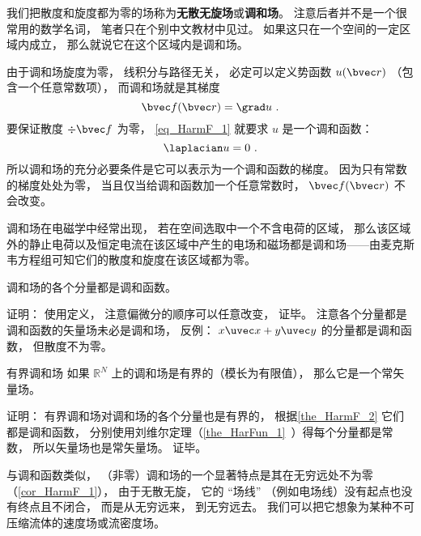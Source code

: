 


我们把散度和旋度都为零的场称为\textbf{无散无旋场}或\textbf{调和场}。 注意后者并不是一个很常用的数学名词， 笔者只在个别中文教材中见过。 如果这只在一个空间的一定区域内成立， 那么就说它在这个区域内是调和场。

由于调和场旋度为零， 线积分与路径无关， 必定可以定义势函数 $u(\bvec r)$ （包含一个任意常数项）， 而调和场就是其梯度
\begin{equation}\label{eq_HarmF_1}
\bvec f(\bvec r) = \grad u~.
\end{equation}
要保证散度 $\div \bvec f$ 为零， \autoref{eq_HarmF_1} 就要求 $u$ 是一个调和函数：
\begin{equation}
\laplacian u = 0~.
\end{equation}
所以调和场的充分必要条件是它可以表示为一个调和函数的梯度。 因为只有常数的梯度处处为零， 当且仅当给调和函数加一个任意常数时， $\bvec f(\bvec r)$ 不会改变。

调和场在电磁学中经常出现， 若在空间选取中一个不含电荷的区域， 那么该区域外的静止电荷以及恒定电流在该区域中产生的电场和磁场都是调和场——由麦克斯韦方程组可知它们的散度和旋度在该区域都为零。

\begin{theorem}{}\label{the_HarmF_2}
调和场的各个分量都是调和函数。
\end{theorem}
证明： 使用定义， 注意偏微分的顺序可以任意改变， 证毕。 注意各个分量都是调和函数的矢量场未必是调和场， 反例： $x\uvec x + y \uvec y$ 的分量都是调和函数， 但散度不为零。

\begin{corollary}{有界调和场}
如果 $\mathbb R^N$ 上的调和场是有界的（模长为有限值）， 那么它是一个常矢量场。
\end{corollary}
证明： 有界调和场对调和场的各个分量也是有界的， 根据\autoref{the_HarmF_2} 它们都是调和函数， 分别使用刘维尔定理（\autoref{the_HarFun_1}~）得每个分量都是常数， 所以矢量场也是常矢量场。 证毕。

与调和函数类似， （非零）调和场的一个显著特点是其在无穷远处不为零（\autoref{cor_HarmF_1}）， 由于无散无旋， 它的 “场线” （例如电场线）没有起点也没有终点且不闭合， 而是从无穷远来， 到无穷远去。 我们可以把它想象为某种不可压缩流体的速度场或流密度场。

